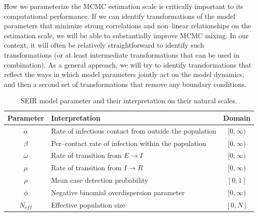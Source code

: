 How we parameterize the MCMC estimation scale is critically important to its computational performance. If we can identify transformations of the model parameters that minimize strong correlations and non--linear relationships on the estimation scale, we will be able to substantially improve MCMC mixing. In our context, it will often be relatively straightforward to identify such transformations (or at least intermediate transformations that can be used in combination). As a general approach, we will try to identify transformations that reflect the ways in which model parameters jointly act on the model dynamics, and then a second set of transformations that remove any boundary conditions. 
\begin{table}[htbp]
	\caption{SEIR model parameter and their interpretation on their natural scales.}
	\label{tab:seir_params_nat}
	\footnotesize
	\centering
	\begin{tabular}{clc}
		\hline
		\textbf{Parameter} & \textbf{Interpretation} & \textbf{Domain}\\
		\hline
		$\alpha$ & Rate of infectious contact from outside the population & $[ 0,\infty) $ \\
		$ \beta $ & Per--contact rate of infection within the population & $[0,\infty) $\\
		$ \omega $ & Rate of transition from $ E\rightarrow I $ & $[ 0,\infty) $\\
		$ \mu $ & Rate of transition from $ I\rightarrow R $ & $[ 0,\infty) $\\
		$ \rho $ & Mean case detection probability & $[ 0,1] $\\
		$ \phi $ & Negative binomial overdispersion parameter & $[ 0,\infty) $ \\
		$ N_{eff} $ & Effective population size & $[0,N]$\\
		\hline
	\end{tabular}
\end{table}

